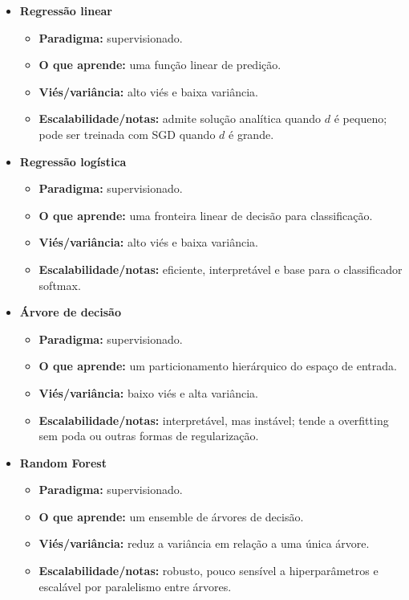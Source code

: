 \documentclass[12pt,a4paper]{article}
\begin{document}
\begin{itemize}
    \item \textbf{Regressão linear}
    \begin{itemize}
        \item \textbf{Paradigma:} supervisionado.
        \item \textbf{O que aprende:} uma função linear de predição.
        \item \textbf{Viés/variância:} alto viés e baixa variância.
        \item \textbf{Escalabilidade/notas:} admite solução analítica quando $d$ é pequeno; pode ser treinada com SGD quando $d$ é grande.
    \end{itemize}

    \item \textbf{Regressão logística}
    \begin{itemize}
        \item \textbf{Paradigma:} supervisionado.
        \item \textbf{O que aprende:} uma fronteira linear de decisão para classificação.
        \item \textbf{Viés/variância:} alto viés e baixa variância.
        \item \textbf{Escalabilidade/notas:} eficiente, interpretável e base para o classificador softmax.
    \end{itemize}

    \item \textbf{Árvore de decisão}
    \begin{itemize}
        \item \textbf{Paradigma:} supervisionado.
        \item \textbf{O que aprende:} um particionamento hierárquico do espaço de entrada.
        \item \textbf{Viés/variância:} baixo viés e alta variância.
        \item \textbf{Escalabilidade/notas:} interpretável, mas instável; tende a overfitting sem poda ou outras formas de regularização.
    \end{itemize}

    \item \textbf{Random Forest}
    \begin{itemize}
        \item \textbf{Paradigma:} supervisionado.
        \item \textbf{O que aprende:} um ensemble de árvores de decisão.
        \item \textbf{Viés/variância:} reduz a variância em relação a uma única árvore.
        \item \textbf{Escalabilidade/notas:} robusto, pouco sensível a hiperparâmetros e escalável por paralelismo entre árvores.
    \end{itemize}


\end{itemize}
\end{document}
